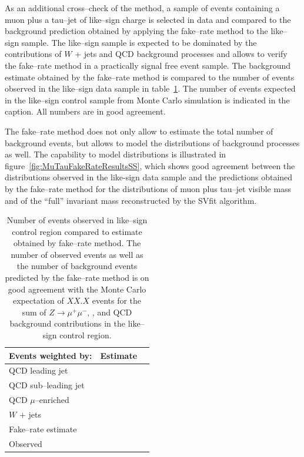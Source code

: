 As an additional cross--check of the method, a sample of events containing a
muon plus a tau--jet of like--sign charge is selected in data and compared to
the background prediction obtained by applying the fake--rate method to the
like--sign sample.  The like--sign sample is expected to be dominated by the
contributions of $W$ + jets and QCD background processes and allows to verify
the fake--rate method in a practically signal free event sample.  The background
estimate obtained by the fake--rate method is compared to the number of events
observed in the like--sign data sample in
table~\ref{tab:MuTauFakeRateResultsSS}.  The number of events expected in the
like--sign control sample from Monte Carlo simulation is indicated in the
caption.  All numbers are in good agreement.

The fake--rate method does not only allow to estimate the total number of
background events, but allows to model the distributions of background processes
as well.  The capability to model distributions is illustrated in
figure~\ref{fig:MuTauFakeRateResultsSS}, which shows good agreement between the
distributions observed in the like-sign data sample and the predictions obtained
by the fake--rate method for the distributions of muon plus tau--jet visible
mass and of the ``full'' invariant mass reconstructed by the SVfit algorithm.

\begin{table}[t]
\begin{center}
\tablesize
\begin{tabular}{|l|c|c|}
\hline
Events weighted by:     & Estimate \\
\hline
QCD leading jet           & \\
QCD sub--leading jet          & \\
QCD $\mu$--enriched     & \\
$W$ + jets              & \\
\hline
Fake--rate estimate     & \\
\hline
Observed                & \\
\hline
\end{tabular}
\end{center}
\begin{center}
\caption{Number of events observed in like--sign control region compared to
estimate obtained by fake--rate method.  The number of observed events as well
as the number of background events predicted by the fake--rate method is on good
agreement with the Monte Carlo expectation of $XX.X$ events for the sum of $Z
\to \mu^{+} \mu^{-}$, \WpJets, \ttbarpJets and QCD background
contributions in the like--sign control region.}
\label{tab:MuTauFakeRateResultsSS}
\end{center}
\end{table}


